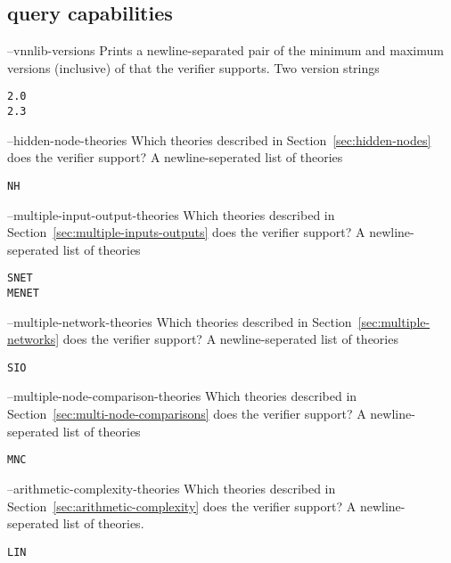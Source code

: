 \subsection{\vnnlib{} query capabilities}

\clOutputOption
{--vnnlib-versions}
{Prints a newline-separated pair of the minimum and maximum versions (inclusive) of \vnnlib{} that the verifier supports.}
{Two version strings}
\begin{lstlisting}[style=bash]
%*\exampleVerifier* supports --vnnlib-versions
2.0
2.3
\end{lstlisting}

\clOutputOption
{--hidden-node-theories}
{Which \hiddenNodes{} theories described in Section~\ref{sec:hidden-nodes} does the verifier support?}
{A newline-seperated list of theories}
\begin{lstlisting}[style=bash]
%*\exampleVerifier* supports --hidden-node-theories
NH
\end{lstlisting}

\clOutputOption
{--multiple-input-output-theories}
{Which \multiIO{} theories described in Section~\ref{sec:multiple-inputs-outputs} does the verifier support?}
{A newline-seperated list of theories}
\begin{lstlisting}[style=bash]
%*\exampleVerifier* supports --multiple-inputs-output-theories
SNET
MENET
\end{lstlisting}

\clOutputOption
{--multiple-network-theories}
{Which \multiNetwork{} theories described in Section~\ref{sec:multiple-networks} does the verifier support?}
{A newline-seperated list of theories}
\begin{lstlisting}[style=bash]
%*\exampleVerifier* supports --multiple-network-theories
SIO
\end{lstlisting}

\clOutputOption
{--multiple-node-comparison-theories}
{Which \multiComparison{} theories described in Section~\ref{sec:multi-node-comparisons} does the verifier support?}
{A newline-seperated list of theories}
\begin{lstlisting}[style=bash]
%*\exampleVerifier* supports --multiple-node-comparison-theories
MNC
\end{lstlisting}

\clOutputOption
{--arithmetic-complexity-theories}
{Which \arithComplexity{} theories described in Section~\ref{sec:arithmetic-complexity} does the verifier support?
}
{A newline-seperated list of theories.}
\begin{lstlisting}[style=bash]
%*\exampleVerifier* supports --arithmetic-complexity-theories
LIN
\end{lstlisting}

